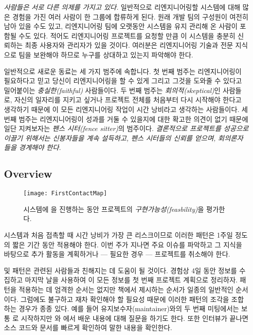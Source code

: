 \documentclass[a4paper,10pt,twoside]{book}
\begin{document}
\begin{bulletlist}
  \item \emph{사람들은 서로 다른 의제를 가지고 있다.}
일반적으로 리엔지니어링할 시스템에 대해 많은 경험을 가진 여러 사람이 한 그룹에 합류하게 된다. 원래 개발 팀의 구성원이 여전히 남아 있을 수도 있고, 리엔지니어링 팀에 오랫동안 시스템을 유지 관리해 온 사람이 포함될 수도 있다. 적어도 리엔지니어링 프로젝트를 요청할 만큼 이 시스템을 충분히 신뢰하는 최종 사용자와 관리자가 있을 것이다. 여러분은 리엔지니어링 기술과 전문 지식으로 팀을 보완해야 하므로 누구를 상대하고 있는지 파악해야 한다. 

일반적으로 새로운 동료는 세 가지 범주에 속합니다. 첫 번째 범주는 리엔지니어링이 필요하다고 믿고 당신이 리엔지니어링을 할 수 있게 그리고 그것을 도와줄 수 있다고 밀어붙이는 \emph{충실한(faithful)} 사람들이다. 두 번째 범주는 \emph{회의적(skeptical)}인 사람들로, 자신의 일자리를 지키고 싶거나 프로젝트 전체를 처음부터 다시 시작해야 한다고 생각하기 때문에 이 모든 리엔지니어링 작업이 시간 낭비라고 생각하는 사람들이다. 세 번째 범주는 리엔지니어링이 성과를 거둘 수 있을지에 대한 확고한 의견이 없기 때문에 일단 지켜보자는 \emph{펜스 시터(fence sitter)}의 범주이다. \emph{결론적으로 프로젝트를 성공으로 이끌기 위해서는 신봉자들을 계속 설득하고, 펜스 시터들의 신뢰를 얻으며, 회의론자들을 경계해야 한다.}

\end{bulletlist}

\subsection*{Overview}

\begin{figure}
\begin{center}
\texttt{[image: FirstContactMap]}
\caption{시스템에 을 진행하는 동안 프로젝트의 \emph{구현가능성(feasbility)}을 평가한다.}
\end{center}
\end{figure}

시스템과 처음 접촉할 때 시간 낭비가 가장 큰 리스크이므로 이러한 패턴은 1주일 정도의 짧은 기간 동안 적용해야 한다. 이번 주가 지나면 주요 이슈를 파악하고 그 지식을 바탕으로 추가 활동을 계획하거나 --- 필요한 경우 --- 프로젝트를 취소해야 한다.

 및  패턴은 관련된 사람들과 친해지는 데 도움이 될 것이다. 경험상 4일 동안 정보를 수집하고 마지막 날을 사용하여 이 모든 정보를 첫 번째 프로젝트 계획으로 정리하자. 패턴을 적용하는 데 엄격한 순서는 없지만 책에서 제시하는 순서가 일종의 일반적인 순서이다. 그럼에도 불구하고 재차 확인해야 할 필요성 때문에 이러한 패턴의 조각을 조합하는 경우가 종종 있다. 예를 들어 유지보수자(maintainer)와의 두 번째 미팅에서는 보통 로 시작하지만 와 에서 배운 내용에 대해 질문을 하기도 한다. 또한 인터뷰가 끝나면 소스 코드와 문서를 빠르게 확인하여 말한 내용을 확인한다.
\end{document}
